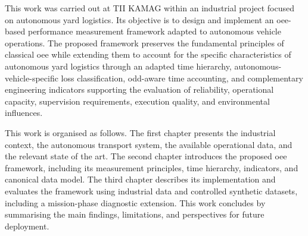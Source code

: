 \documentclass[12pt,a4paper]{report}
\begin{document}
This work was carried out at TII KAMAG within an industrial project focused on autonomous
yard logistics. Its objective is to design and implement an \gls{oee}-based performance
measurement framework adapted to autonomous vehicle operations. The proposed framework
preserves the fundamental principles of classical \gls{oee} while extending them to account
for the specific characteristics of autonomous yard logistics through an adapted time hierarchy,
autonomous-vehicle-specific loss classification, \gls{odd}-aware time accounting, and
complementary engineering indicators supporting the evaluation of reliability, operational
capacity, supervision requirements, execution quality, and environmental influences.

This work is organised as follows. The first chapter presents the industrial context, the
autonomous transport system, the available operational data, and the relevant state of the art.
The second chapter introduces the proposed \gls{oee} framework, including its measurement
principles, time hierarchy, indicators, and canonical data model. The third chapter describes
its implementation and evaluates the framework using industrial data and controlled synthetic
datasets, including a mission-phase diagnostic extension. This work concludes by summarising
the main findings, limitations, and perspectives for future deployment.

\cleardoublepage



\cleardoublepage



\cleardoublepage



\cleardoublepage

\renewcommand*{\gls}[1]{\glsentryshort{#1}}
\renewcommand*{\glspl}[1]{\glsentryshortpl{#1}}
\renewcommand*{\acrshort}[1]{\glsentryshort{#1}}

% 

\cleardoublepage






{}
\printbibliography

\cleardoublepage
\thispagestyle{empty}

\end{document}
